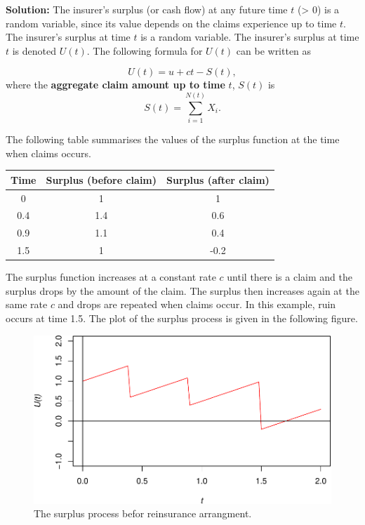 \documentclass[landscape, 20pt]{extreport}
\theoremstyle{definition}
\theoremstyle{definition}
\theoremstyle{definition}
\theoremstyle{definition}
\theoremstyle{remark}
\begin{document}
\textbf{Solution:}
The insurer's surplus (or cash flow) at any future time \(t\) (\textgreater{} 0) is a random variable, since its value depends on the claims experience up to time \(t\). The insurer's surplus at time \(t\) is a random variable. The insurer's surplus at time \(t\) is denoted \(U(t)\). The following formula for \(U(t)\) can be written as

\begin{equation}
U(t) = u + ct - S(t),
\end{equation}
where the \textbf{aggregate claim amount up to time}
\(t\), \(S(t)\) is
\begin{equation}
S(t) = \sum_{i = 1}^{N(t)} X_i .
\end{equation}

The following table summarises the values of the surplus function at the time when claims occurs.

\begin{longtable}[]{@{}ccc@{}}
\toprule
Time & Surplus (before claim) & Surplus (after claim) \\
\midrule
\endhead
0 & 1 & 1 \\
0.4 & 1.4 & 0.6 \\
0.9 & 1.1 & 0.4 \\
1.5 & 1 & -0.2 \\
\bottomrule
\end{longtable}

The surplus function increases at a constant rate \(c\) until there is a claim and the surplus drops by the amount of the claim. The surplus then increases again at the same rate \(c\) and drops are repeated when claims occur. In this example,
ruin occurs at time 1.5.
The plot of the surplus process is given in the following figure.

\begin{figure}
\centering
\includegraphics{unnamed-chunk-19-1.pdf}
\caption{\label{fig:unnamed-chunk-19}The surplus process befor reinsurance arrangment.}
\end{figure}
\end{document}
